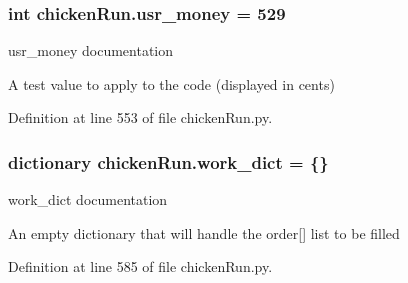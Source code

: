 \hypertarget{namespacechickenRun_a137e626156e77d36405cf80d9ded36b2}{
\subsubsection[{usr\-\_\-money}]{\setlength{\rightskip}{0pt plus 5cm}int chicken\-Run.\-usr\-\_\-money = 529}}\label{namespacechickenRun_a137e626156e77d36405cf80d9ded36b2}


usr\-\_\-money documentation 

A test value to apply to the code (displayed in cents) 

Definition at line 553 of file chicken\-Run.\-py.

\hypertarget{namespacechickenRun_aa4143842540386843cf5c30e0b6e5290}{
\subsubsection[{work\-\_\-dict}]{\setlength{\rightskip}{0pt plus 5cm}dictionary chicken\-Run.\-work\-\_\-dict = \{\}}}\label{namespacechickenRun_aa4143842540386843cf5c30e0b6e5290}


work\-\_\-dict documentation 

An empty dictionary that will handle the order\mbox{[}\mbox{]} list to be filled 

Definition at line 585 of file chicken\-Run.\-py.

